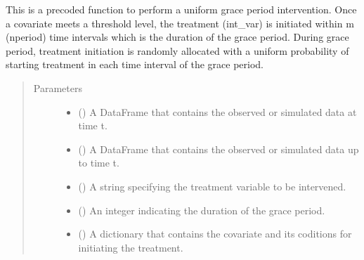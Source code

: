 \documentclass[letterpaper,10pt,english]{sphinxmanual}
\begin{document}
\begin{fulllineitems}
\label{\detokenize{Specifications/Interventions:pygformula.parametric_gformula.interventions.uniform_grace_period}}
\sphinxAtStartPar
This is a pre\sphinxhyphen{}coded function to perform a uniform grace period intervention. Once a covariate
meets a threshold level, the treatment (int\_var) is initiated within m (nperiod) time intervals which is the duration
of the grace period. During grace period, treatment initiation is randomly allocated with a uniform probability of
starting treatment in each time interval of the grace period.
\begin{quote}\begin{description}
\item[{Parameters}] \leavevmode\begin{itemize}
\item {} 
\sphinxAtStartPar
{} () \textendash{} A DataFrame that contains the observed or simulated data at time t.

\item {} 
\sphinxAtStartPar
{} () \textendash{} A DataFrame that contains the observed or simulated data up to time t.

\item {} 
\sphinxAtStartPar
{} () \textendash{} A string specifying the treatment variable to be intervened.

\item {} 
\sphinxAtStartPar
{} () \textendash{} An integer indicating the duration of the grace period.

\item {} 
\sphinxAtStartPar
{} () \textendash{} A dictionary that contains the covariate and its coditions for initiating the treatment.


\end{itemize}
\end{description}
\end{quote}
\end{fulllineitems}
\end{document}
